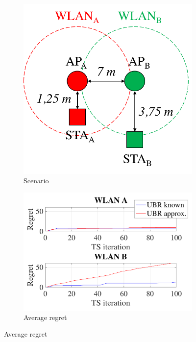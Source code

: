 \documentclass[preprint,12pt]{elsarticle}
\begin{document}
\begin{figure}[h!]
	\centering
	\begin{subfigure}[b]{0.25\textwidth}
		\includegraphics[width=\textwidth]{s1_new}
		\caption{Scenario}
		\label{fig:selfish_s3}
	\end{subfigure}
	\begin{subfigure}[b]{0.3\textwidth}
		\includegraphics[width=\textwidth]{approx_vs_actual_regret}
		\caption{Average regret}
		\label{fig:approx_vs_actual_regret}
	\end{subfigure}

\end{figure}
\end{document}
